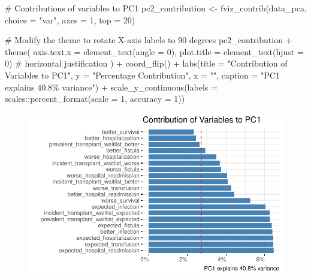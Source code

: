 \documentclass[
  letterpaper,
  DIV=11,
  numbers=noendperiod]{scrreprt}
\newenvironment{Shaded}{\begin{snugshade}}{\end{snugshade}}
\newcommand{\AttributeTok}[1]{\textcolor[rgb]{0.40,0.45,0.13}{#1}}
\newcommand{\CommentTok}[1]{\textcolor[rgb]{0.37,0.37,0.37}{#1}}
\newcommand{\DecValTok}[1]{\textcolor[rgb]{0.68,0.00,0.00}{#1}}
\newcommand{\FunctionTok}[1]{\textcolor[rgb]{0.28,0.35,0.67}{#1}}
\newcommand{\NormalTok}[1]{\textcolor[rgb]{0.00,0.23,0.31}{#1}}
\newcommand{\OtherTok}[1]{\textcolor[rgb]{0.00,0.23,0.31}{#1}}
\newcommand{\SpecialCharTok}[1]{\textcolor[rgb]{0.37,0.37,0.37}{#1}}
\newcommand{\StringTok}[1]{\textcolor[rgb]{0.13,0.47,0.30}{#1}}
\begin{document}
\begin{Shaded}
\begin{Highlighting}[]
\CommentTok{\# Contributions of variables to PC1}
\NormalTok{pc2\_contribution }\OtherTok{\textless{}{-}} \FunctionTok{fviz\_contrib}\NormalTok{(data\_pca, }\AttributeTok{choice =} \StringTok{"var"}\NormalTok{, }\AttributeTok{axes =} \DecValTok{1}\NormalTok{, }\AttributeTok{top =} \DecValTok{20}\NormalTok{)}

\CommentTok{\# Modify the theme to rotate X{-}axis labels to 90 degrees}
\NormalTok{pc2\_contribution }\SpecialCharTok{+}
  \FunctionTok{theme}\NormalTok{(}
    \AttributeTok{axis.text.x =} \FunctionTok{element\_text}\NormalTok{(}\AttributeTok{angle =} \DecValTok{0}\NormalTok{),}
    \AttributeTok{plot.title =} \FunctionTok{element\_text}\NormalTok{(}\AttributeTok{hjust =} \DecValTok{0}\NormalTok{)  }\CommentTok{\# horizontal justification}
\NormalTok{  ) }\SpecialCharTok{+}
  \FunctionTok{coord\_flip}\NormalTok{() }\SpecialCharTok{+}
  \FunctionTok{labs}\NormalTok{(}\AttributeTok{title =} \StringTok{"Contribution of Variables to PC1"}\NormalTok{,}
       \AttributeTok{y =} \StringTok{"Percentage Contribution"}\NormalTok{,}
       \AttributeTok{x =} \StringTok{""}\NormalTok{,}
       \AttributeTok{caption =} \StringTok{"PC1 explains 40.8\% variance"}\NormalTok{) }\SpecialCharTok{+}
  \FunctionTok{scale\_y\_continuous}\NormalTok{(}\AttributeTok{labels =}\NormalTok{ scales}\SpecialCharTok{::}\FunctionTok{percent\_format}\NormalTok{(}\AttributeTok{scale =} \DecValTok{1}\NormalTok{,}
                                                     \AttributeTok{accuracy =} \DecValTok{1}\NormalTok{))}
\end{Highlighting}
\end{Shaded}

\begin{figure}[H]

{\centering \includegraphics{analysis_files/figure-pdf/unnamed-chunk-24-1.pdf}

}

\end{figure}
\end{document}
